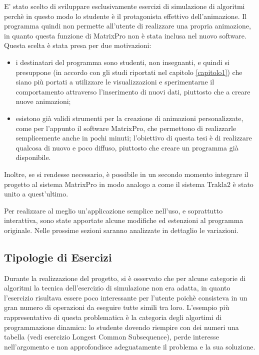 E' stato scelto di sviluppare esclusivamente esercizi di simulazione
di algoritmi perchè in questo modo lo studente è il protagonista effettivo
dell'animazione. Il programma quindi non permette all'utente di realizzare
una propria animazione, in quanto questa funzione di MatrixPro non
è stata inclusa nel nuovo software. Questa scelta è stata presa per
due motivazioni: 
\begin{itemize}
\item i destinatari del programma sono studenti, non insegnanti, e quindi
si presuppone (in accordo con gli studi riportati nel capitolo \ref{capitolo1})
che siano più portati a utilizzare le visualizzazioni e sperimentarne
il comportamento attraverso l'inserimento di nuovi dati, piuttosto
che a creare nuove animazioni;
\item esistono già validi strumenti per la creazione di animazioni personalizzate,
come per l'appunto il software MatrixPro, che permettono di realizzarle
semplicemente anche in pochi minuti; l'obiettivo di questa tesi è
di realizzare qualcosa di nuovo e poco diffuso, piuttosto che creare
un programma già disponibile.
\end{itemize}
Inoltre, se si rendesse necessario, è possibile in un secondo momento
integrare il progetto al sistema MatrixPro in modo analogo a come
il sistema Trakla2 è stato unito a quest'ultimo.

Per realizzare al meglio un'applicazione semplice nell'uso, e soprattutto
interattiva, sono state apportate alcune modifiche ed estenzioni al
programma originale. Nelle prossime sezioni saranno analizzate in
dettaglio le variazioni.


\subsection{\label{sub:Tipologie-di-Esercizi}Tipologie di Esercizi}

Durante la realizzazione del progetto, si è osservato che per alcune
categorie di algoritmi la tecnica dell'esercizio di simulazione non
era adatta, in quanto l'esercizio risultava essere poco interessante
per l'utente poichè consisteva in un gran numero di operazioni da
eseguire tutte simili tra loro. L'esempio più rappresentativo di questa
problematica è la categoria degli algortimi di programmazione dinamica:
lo studente dovendo riempire con dei numeri una tabella (vedi esercizio
Longest Common Subsequence), perde interesse nell'argomento e non
approfondisce adeguatamente il problema e la sua soluzione.

